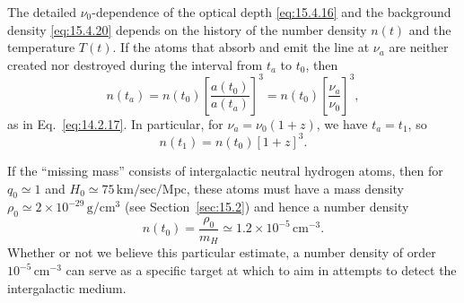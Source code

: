 The detailed \(\nu_0\)-dependence of the optical depth
\eqref{eq:15.4.16} and the background density \eqref{eq:15.4.20} depends
on the history of the number density \(n(t)\) and the temperature \(T(t)\).
If the atoms that absorb and emit the line at \(\nu_a\) are neither created
nor destroyed during the interval from \(t_a\) to \(t_0\), then
\begin{equation}
  n(t_a)
  =
  n(t_0)\left[\frac{a(t_0)}{a(t_a)}\right]^3
  =
  n(t_0)\left[\frac{\nu_a}{\nu_0}\right]^3,
  \tag{15.4.22}\label{eq:15.4.22}
\end{equation}
as in Eq.~\eqref{eq:14.2.17}. In particular, for
\(\nu_a=\nu_0(1+z)\), we have \(t_a=t_1\), so
\begin{equation}
  n(t_1)=n(t_0)[1+z]^3.
  \tag{15.4.23}\label{eq:15.4.23}
\end{equation}

If the ``missing mass'' consists of intergalactic neutral hydrogen atoms, then
for \(q_0\simeq1\) and \(H_0\simeq75\,\mathrm{km/sec/Mpc}\), these atoms
must have a mass density
\(\rho_0\simeq2\times10^{-29}\,\mathrm{g/cm^3}\) (see
Section~\ref{sec:15.2}) and hence a number density
\begin{equation}
  n(t_0)=\frac{\rho_0}{m_H}\simeq1.2\times10^{-5}\,\mathrm{cm^{-3}}.
  \tag{15.4.24}\label{eq:15.4.24}
\end{equation}
Whether or not we believe this particular estimate, a number density of order
\(10^{-5}\,\mathrm{cm^{-3}}\) can serve as a specific target at which to aim
in attempts to detect the intergalactic medium.

